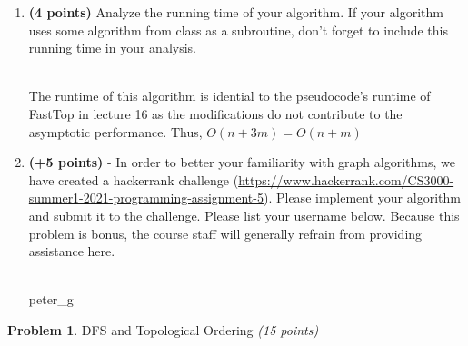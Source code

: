\documentclass[11pt]{article}
\theoremstyle{definition}
\theoremstyle{theorem}
\newtheorem{prob}{Problem}
\newcommand{\solution}{\medskip\noindent{\color{DarkBlue}\textbf{Solution:}}}
\begin{document}
\begin{enumerate}[label=(\alph*)]
As that is a provided contraint of the graph input, that it is a acyclic DAG. We know that we can get a topological ordering. 
In a normal topological sort, know that we can get a list which is a guaranteed precedence ordering of the nodes provided.
I alter that algorithm ever-so-slighty to maintain its correctness of topological order, but labeling them through an accumulation of their $t(i)$ value.
We know based on the alogrithm that the accumulation will only be passed to nodes that are in the precendence of the currently deleting node,
as the next-to-be deleted are out\_degrees of it. However, based on the configuration of the graph, we may have multiple precedences for a single node,
and this causes a value conflict in out labeling. To solve this, we take the max(old accumulation, new accumulation) as the problem constraints mentions 
that all preceding nodes but be completed, even in parallel. Thus, the soonest time the node have be completed is after the longest prerequisite is.

\item  \textbf{(4 points)} Analyze the running time of your algorithm.  If your algorithm uses some algorithm from class as a subroutine, don't forget to include this running time in your analysis.

\solution \\ 
The runtime of this algorithm is idential to the pseudocode's runtime of FastTop in lecture 16 as the modifications do not contribute to the asymptotic performance.
Thus, $O(n + 3m) = O(n + m)$


\item   \textbf{(+5 points)} - In order to better your familiarity with graph algorithms, we have created a hackerrank challenge (\href{https://www.hackerrank.com/CS3000-summer1-2021-programming-assignment-5}{https://www.hackerrank.com/CS3000-summer1-2021-programming-assignment-5}). Please implement your algorithm and submit it to the challenge. Please list your username below. Because this problem is bonus, the course staff will generally refrain from providing assistance here.

\solution \\
peter\_g

\end{enumerate}




\newpage

\begin{prob}DFS and Topological Ordering  \emph{(15 points)}\end{prob}
\end{document}
